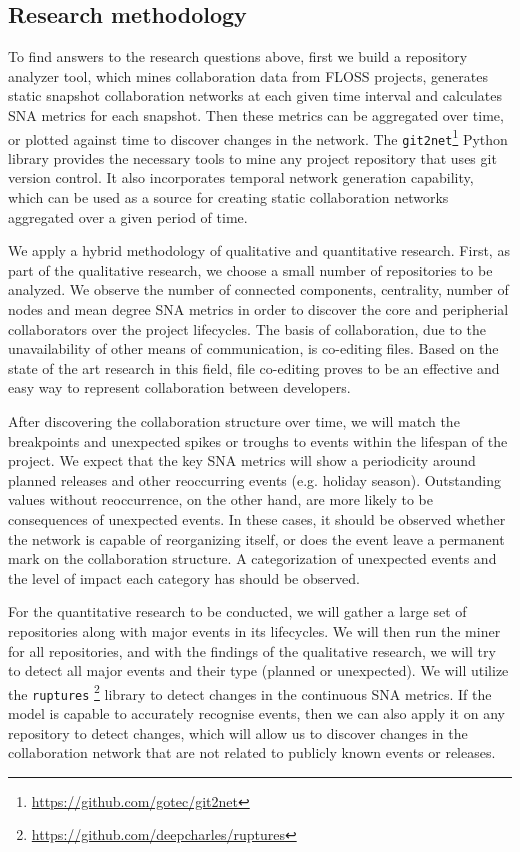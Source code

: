 \subsection{Research methodology}
To find answers to the research questions above, first we build a repository analyzer tool, which mines collaboration data from FLOSS projects, generates static snapshot collaboration networks at each given time interval and calculates SNA metrics for each snapshot. Then these metrics can be aggregated over time, or plotted against time to discover changes in the network. The \texttt{git2net}\footnote{\url{https://github.com/gotec/git2net}} \cite{goteAnalysingTimeStampedCoEditing2019} Python library provides the necessary tools to mine any project repository that uses git version control. It also incorporates temporal network generation capability, which can be used as a source for creating static collaboration networks aggregated over a given period of time.


We apply a hybrid methodology of qualitative and quantitative research. First, as part of the qualitative research, we choose a small number of repositories to be analyzed. We observe the number of connected components, centrality, number of nodes and mean degree SNA metrics in order to discover the core and peripherial collaborators over the project lifecycles. The basis of collaboration, due to the unavailability of other means of communication, is co-editing files. Based on the state of the art research in this field, file co-editing proves to be an effective and easy way to represent collaboration between developers.

After discovering the collaboration structure over time, we will match the breakpoints and unexpected spikes or troughs to events within the lifespan of the project. We expect that the key SNA metrics will show a periodicity around planned releases and other reoccurring events (e.g. holiday season). Outstanding values without reoccurrence, on the other hand, are more likely to be consequences of unexpected events. In these cases, it should be observed whether the network is capable of reorganizing itself, or does the event leave a permanent mark on the collaboration structure. A categorization of unexpected events and the level of impact each category has should be observed.

For the quantitative research to be conducted, we will gather a large set of repositories along with major events in its lifecycles. We will then run the miner for all repositories, and with the findings of the qualitative research, we will try to detect all major events and their type (planned or unexpected). We will utilize the \texttt{ruptures} \footnote{\url{https://github.com/deepcharles/ruptures}} library to detect changes in the continuous SNA metrics. If the model is capable to accurately recognise events, then we can also apply it on any repository to detect changes, which will allow us to discover changes in the collaboration network that are not related to publicly known events or releases.


